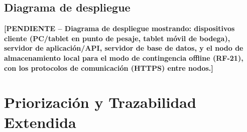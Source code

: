 \documentclass[11pt,a4paper]{article}
\newcommand{\PENDIENTE}[1]{\textcolor{pendiente}{\textbf{[PENDIENTE -- #1]}}}
\begin{document}
\subsection{Diagrama de despliegue}
\PENDIENTE{Diagrama de despliegue mostrando: dispositivos cliente (PC/tablet en punto de pesaje, tablet móvil de bodega), servidor de aplicación/API, servidor de base de datos, y el nodo de almacenamiento local para el modo de contingencia offline (RF-21), con los protocolos de comunicación (HTTPS) entre nodos.}

\section{Priorización y Trazabilidad Extendida}
\end{document}
